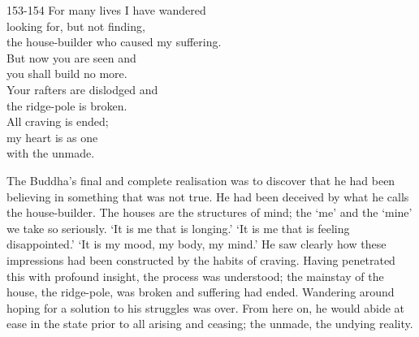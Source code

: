 
\begin{dhpVerse}{153-154}
\label{dhp-153}\label{dhp-154}
For many lives I have wandered\\
looking for, but not finding,\\
the house-builder who caused my suffering.\\
But now you are seen and\\
you shall build no more.\\
Your rafters are dislodged and\\
the ridge-pole is broken.\\
All craving is ended;\\
my heart is as one\\
with the unmade.
\end{dhpVerse}

\begin{dhpRefl}

The Buddha's final and complete realisation was to discover that he
had been believing in something that was not true. He had been
deceived by what he calls the house-builder. The houses are the
structures of mind; the `me' and the `mine' we take so seriously. `It
is me that is longing.' `It is me that is feeling disappointed.'  `It
is my mood, my body, my mind.'  He saw clearly how these impressions
had been constructed by the habits of craving. Having penetrated this
with profound insight, the process was understood; the mainstay of
the house, the ridge-pole, was broken and suffering had ended.
Wandering around hoping for a solution to his struggles was over.
From here on, he would abide at ease in the state prior to all
arising and ceasing; the unmade, the undying reality.

\end{dhpRefl}

